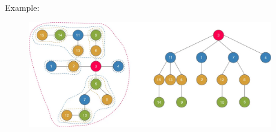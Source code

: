 Example:

\begin{figure}[H]
  \begin{center}
    \includegraphics[width=0.95\textwidth]{media/centroidDecompositionExample.png}
  \end{center}
\end{figure}

